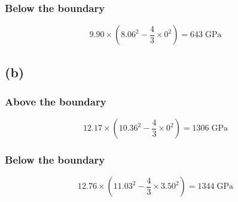 \subsubsection*{Below the boundary}
\begin{equation*}
    9.90\times(8.06^2 - \frac{4}{3}\times 0^2) = 643 \; \text{GPa}
\end{equation*}


\subsection*{(b)}
\subsubsection*{Above the boundary}
\begin{equation*}
    12.17\times(10.36^2 - \frac{4}{3}\times 0^2) = 1306 \; \text{GPa}
\end{equation*}

\subsubsection*{Below the boundary}
\begin{equation*}
    12.76\times(11.03^2 - \frac{4}{3}\times 3.50^2) = 1344 \; \text{GPa}
\end{equation*}